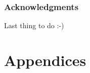 \documentclass[a4paper,11pt,twoside]{ThesisStyle}
\begin{document}



\setcounter{page}{0}

\section*{Acknowledgments}

Last thing to do :-)


\dominitoc
\tableofcontents



\mainmatter










\appendix

\cleardoublepage
\mtcaddpart[Appendices]
\part*{Appendices}


\printbibliography
\end{document}
